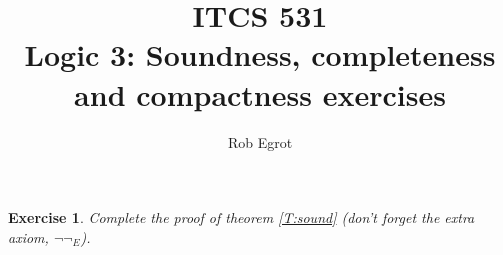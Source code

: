 \documentclass{article}
\title{ITCS 531 \\Logic 3: Soundness, completeness and compactness exercises}
\author{Rob Egrot}
\date{}
\theoremstyle{plain}
\newtheorem{Q}[theorem]{Exercise}{\bfseries}{\upshape}
\begin{document}
\maketitle

\begin{Q}\label{\prefix Q:proof}
Complete the proof of theorem \ref{T:sound} (don't forget the extra axiom, $\neg\neg_E$).
\end{Q}
\begin{comment}
\textbf{Solution:}
There are four rules left to check: $\vee_I$, $\vee_E$, $\rightarrow_E$, and $\neg\neg_E$. Technically $\vee_I$ is two rules, but we'll just do $\vee_{I_l}$ as $\vee_{I_r}$ is essentially the same.
\begin{enumerate}[]
\item$\vee_I$: Suppose the last step in the proof is an application of $\vee_{I_l}$. Then we have derived $\phi$ from $\Gamma$, and from this we get $\phi\vee \psi$. By the inductive hypothesis we have $\Gamma\models \phi$, and so we obviously have $\Gamma\models \phi\vee \psi$, by properties of truth tables.
\item$\vee_E$: Suppose the last step is an application of $\vee_E$. Then we have derived $\phi\vee\psi$ from $\Gamma$, and we have derived $\theta$ from the assumption of $\{\phi\}\cup\Gamma$, and also from the assumption of $\{\psi\}\cup\Gamma$. Since these internal derivations must be shorter than the main derivation, the inductive hypothesis applies. So we have $\Gamma\models \phi\vee\psi$, $\{\phi\}\cup\Gamma\models \theta$, and  $\{\psi\}\cup\Gamma\models\theta$. Since $\Gamma\models \phi\vee\psi$ if and only if either $\Gamma\models \phi$ or $\Gamma\models \psi$, any assignment satisfying $\Gamma$ must also satisfy either $\{\phi\}\cup\Gamma$ or $\{\psi\}\cup\Gamma$. In either case it must satisfy $\theta$ too, so we are done.
\item $\rightarrow_E$: Here we have derived $\phi\rightarrow \psi$ and $\phi$ from $\Gamma$. So, by the inductive hypothesis, any assignment satisfying $\Gamma$ must also satisfy  $\phi\rightarrow \psi$ and $\phi$. So any such assignment must also satisfy $\psi$, and we are done.
\item$\neg\neg_E$: Here we have $\Gamma\models \neg\neg\phi$, by the inductive hypothesis. Clearly $\Gamma\models \phi$, as an assignment satisfies $\neg\neg\phi$ if and only if it satisfies $\phi$.
\end{enumerate}
\end{comment}
\end{document}

